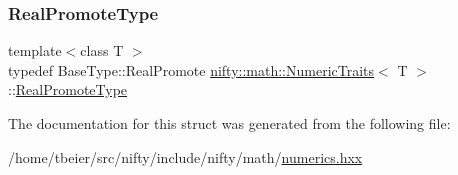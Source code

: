 \mbox{\label{structnifty_1_1math_1_1NumericTraits_a5030d5141aa16424cd49d272306cd716}} 
\subsubsection{\texorpdfstring{Real\+Promote\+Type}{RealPromoteType}}
{\footnotesize\ttfamily template$<$class T $>$ \\
typedef Base\+Type\+::\+Real\+Promote \hyperlink{structnifty_1_1math_1_1NumericTraits}{nifty\+::math\+::\+Numeric\+Traits}$<$ T $>$\+::\hyperlink{structnifty_1_1math_1_1NumericTraits_a5030d5141aa16424cd49d272306cd716}{Real\+Promote\+Type}}



The documentation for this struct was generated from the following file\+:\begin{DoxyCompactItemize}
\item 
/home/tbeier/src/nifty/include/nifty/math/\hyperlink{numerics_8hxx}{numerics.\+hxx}\end{DoxyCompactItemize}
